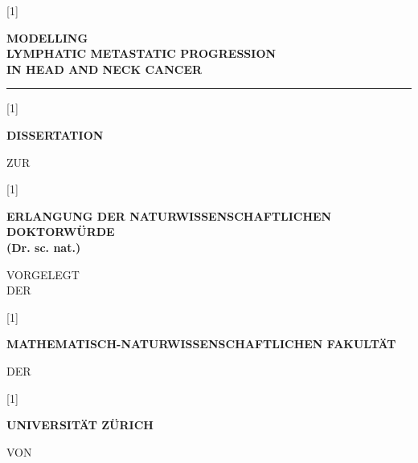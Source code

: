 \documentclass[\relativeRoot/main.tex]{subfiles}
\begin{document}
    \begin{titlepage}
        \begin{center}
            \scalebox{0.7}[1]{\begin{minipage}{1.4\textwidth}
                \centering
                \bfseries
                \huge
                \MakeUppercase{Modelling\\Lymphatic Metastatic Progression\\in Head and Neck Cancer}
            \end{minipage}} \vspace{5mm}
            
            \rule{2cm}{0.5pt} \vspace{1cm}

            \scalebox{0.8}[1]{\begin{minipage}{\textwidth}
                \centering
                \bfseries
                \Large
                DISSERTATION
            \end{minipage}} \vfill
            
            {\footnotesize ZUR} \vfill

            \scalebox{0.7}[1]{\begin{minipage}{1.4\textwidth}
                \centering
                \bfseries
                \large
                ERLANGUNG DER NATURWISSENSCHAFTLICHEN DOKTORWÜRDE\\
                {\sc (Dr. sc. nat.)}
            \end{minipage}} \vfill

            {\footnotesize VORGELEGT\\DER} \vfill

            \scalebox{0.7}[1]{\begin{minipage}{1.4\textwidth}
                \centering
                \bfseries
                \large
                MATHEMATISCH-NATURWISSENSCHAFTLICHEN FAKULTÄT
            \end{minipage}} \vfill

            {\footnotesize DER} \vfill

            \scalebox{0.9}[1]{\begin{minipage}{0.8\textwidth}
                \centering
                \bfseries
                \large
                UNIVERSITÄT ZÜRICH
            \end{minipage}} \vfill

            {\footnotesize VON} \vspace{3mm}


\end{center}
\end{titlepage}
\end{document}
